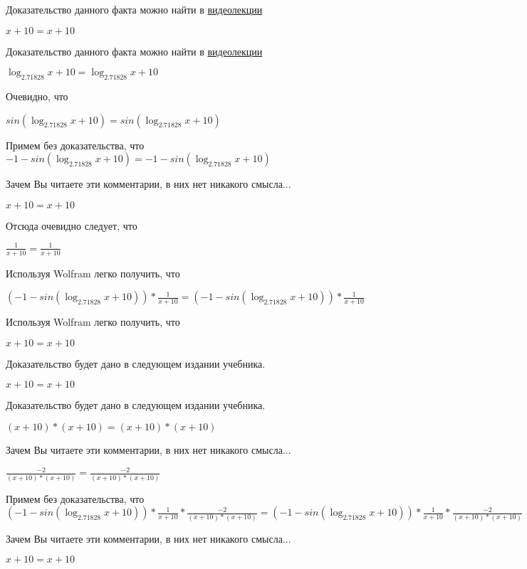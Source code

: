 \documentclass[12pt,a4paper,fleqn]{article}
\theoremstyle{definition}
\begin{document}
Доказательство данного факта можно найти в \href{https://www.youtube.com/watch?v=dQw4w9WgXcQ}{видеолекции}

$ x  +  10  =  x  +  10 $

Доказательство данного факта можно найти в \href{https://www.youtube.com/watch?v=dQw4w9WgXcQ}{видеолекции}

$\log_{ 2.71828 }{ x  +  10 } = \log_{ 2.71828 }{ x  +  10 }$

Очевидно, что

$sin(\log_{ 2.71828 }{ x  +  10 }) = sin(\log_{ 2.71828 }{ x  +  10 })$

Примем без доказательства, что
$ -1  - sin(\log_{ 2.71828 }{ x  +  10 }) =  -1  - sin(\log_{ 2.71828 }{ x  +  10 })$

Зачем Вы читаете эти комментарии, в них нет никакого смысла...

$ x  +  10  =  x  +  10 $

Отсюда очевидно следует, что

$\frac{ 1 }{ x  +  10 }
 = \frac{ 1 }{ x  +  10 }
$

Используя Wolfram легко получить, что

$( -1  - sin(\log_{ 2.71828 }{ x  +  10 })) * \frac{ 1 }{ x  +  10 }
 = ( -1  - sin(\log_{ 2.71828 }{ x  +  10 })) * \frac{ 1 }{ x  +  10 }
$

Используя Wolfram легко получить, что

$ x  +  10  =  x  +  10 $

Доказательство будет дано в следующем издании учебника.

$ x  +  10  =  x  +  10 $

Доказательство будет дано в следующем издании учебника.

$( x  +  10 ) * ( x  +  10 ) = ( x  +  10 ) * ( x  +  10 )$

Зачем Вы читаете эти комментарии, в них нет никакого смысла...

$\frac{ -2 }{( x  +  10 ) * ( x  +  10 )}
 = \frac{ -2 }{( x  +  10 ) * ( x  +  10 )}
$

Примем без доказательства, что
$( -1  - sin(\log_{ 2.71828 }{ x  +  10 })) * \frac{ 1 }{ x  +  10 }
 * \frac{ -2 }{( x  +  10 ) * ( x  +  10 )}
 = ( -1  - sin(\log_{ 2.71828 }{ x  +  10 })) * \frac{ 1 }{ x  +  10 }
 * \frac{ -2 }{( x  +  10 ) * ( x  +  10 )}
$

Зачем Вы читаете эти комментарии, в них нет никакого смысла...

$ x  +  10  =  x  +  10 $
\end{document}
